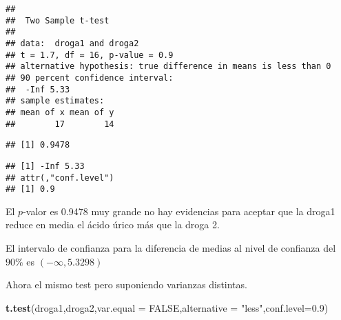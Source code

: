 \documentclass[
]{article}
\newenvironment{Shaded}{\begin{snugshade}}{\end{snugshade}}
\newcommand{\DataTypeTok}[1]{\textcolor[rgb]{0.13,0.29,0.53}{#1}}
\newcommand{\FloatTok}[1]{\textcolor[rgb]{0.00,0.00,0.81}{#1}}
\newcommand{\KeywordTok}[1]{\textcolor[rgb]{0.13,0.29,0.53}{\textbf{#1}}}
\newcommand{\NormalTok}[1]{#1}
\newcommand{\OperatorTok}[1]{\textcolor[rgb]{0.81,0.36,0.00}{\textbf{#1}}}
\newcommand{\OtherTok}[1]{\textcolor[rgb]{0.56,0.35,0.01}{#1}}
\newcommand{\StringTok}[1]{\textcolor[rgb]{0.31,0.60,0.02}{#1}}
\begin{document}
\begin{verbatim}
## 
##  Two Sample t-test
## 
## data:  droga1 and droga2
## t = 1.7, df = 16, p-value = 0.9
## alternative hypothesis: true difference in means is less than 0
## 90 percent confidence interval:
##  -Inf 5.33
## sample estimates:
## mean of x mean of y 
##        17        14
\end{verbatim}

\begin{Shaded}
\end{Shaded}

\begin{verbatim}
## [1] 0.9478
\end{verbatim}

\begin{Shaded}
\end{Shaded}

\begin{verbatim}
## [1] -Inf 5.33
## attr(,"conf.level")
## [1] 0.9
\end{verbatim}

El \(p\)-valor es 0.9478 muy grande no hay evidencias para aceptar que
la droga1 reduce en media el ácido úrico más que la droga 2.

El intervalo de confianza para la diferencia de medias al nivel de
confianza del \(90\%\) es \((-\infty, 5.3298)\)

Ahora el mismo test pero suponiendo varianzas distintas.

\begin{Shaded}
\begin{Highlighting}[]
\KeywordTok{t.test}\NormalTok{(droga1,droga2,}\DataTypeTok{var.equal =} \OtherTok{FALSE}\NormalTok{,}\DataTypeTok{alternative =} \StringTok{"less"}\NormalTok{,}\DataTypeTok{conf.level=}\FloatTok{0.9}\NormalTok{)}
\end{Highlighting}
\end{Shaded}
\end{document}
